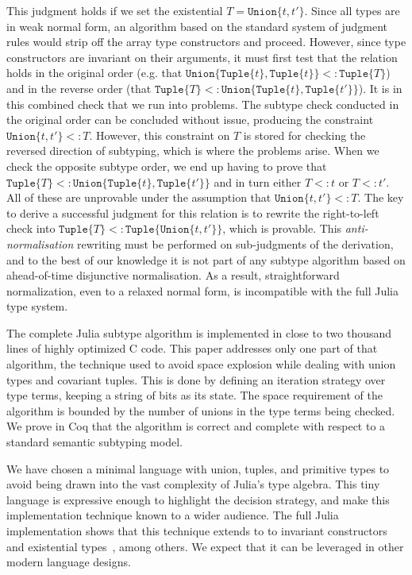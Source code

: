 \documentclass[a4paper,english]{lipics-v2019}
\newcommand{\xt}[1]{\texttt{#1}}
\newcommand{\union}[2]{\xt{Union\{}#1,#2\xt{\}}}
\newcommand{\tuple}[1]{\xt{Tuple\{}#1\xt{\}}}
\begin{document}
\noindent 
This judgment holds if we set the existential {\small$T=\union{t}{t'}$}.
Since all types are in weak normal form, an algorithm based on the standard
system of judgment rules would strip off the array type constructors and
proceed.  However, since type constructors are invariant on their arguments,
it must first test that the relation holds in the original order (e.g. that
{\small$\union{\tuple{t}}{\tuple{t}}<:\tuple{T}$}) and in the reverse order
(that {\small$\tuple{T}<:\union{\tuple{t}}{\tuple{t'}}$}). It is in this
combined check that we run into problems.
%
The subtype check conducted in the original order can be concluded without issue, producing
the constraint {\small$\union{t}{t'} <: T$}. However, this constraint
on $T$ is stored for checking the reversed direction of subtyping, which is
where the problems arise. When we check the opposite subtype order, we end
up having to prove that {\small$\tuple{T}<:\union{\tuple{t}}{\tuple{t'}}$}
and in turn either {\small$T<:t$} or {\small$T<:t'$}. All of these are
unprovable under the assumption that {\small$\union{t}{t'} <: T$}.
%
The key to derive a successful judgment for this relation is to rewrite the
right-to-left check into {\small$\tuple{T}<:\tuple{\union{t}{t'}}$}, which is
provable. This \emph{anti-normalisation} rewriting must be performed on
sub-judgments of the derivation, and to the best of our knowledge it is not
part of any subtype algorithm based on ahead-of-time disjunctive
normalisation. As a result, straightforward normalization, even to a relaxed
normal form, is incompatible with the full Julia type system.

The complete Julia subtype algorithm is implemented in close to two thousand
lines of highly optimized C code. This paper addresses only one part of that
algorithm, the technique used to avoid space explosion while dealing with
union types and covariant tuples. This is done by defining an iteration
strategy over type terms, keeping a string of bits as its state. The space
requirement of the algorithm is bounded by the number of unions in the type
terms being checked. We prove in Coq that the algorithm is correct and
complete with respect to a standard semantic subtyping model.

We have chosen a minimal language with union, tuples, and primitive types to
avoid being drawn into the vast complexity of Julia's type algebra. This tiny
language is expressive enough to highlight the decision strategy, and make
this implementation technique known to a wider audience. The full Julia
implementation shows that this technique extends to to invariant constructors
and existential types~\cite{DBLP:NardelliBPCBV18}, among others. We expect
that it can be leveraged in other modern language designs.
\end{document}
